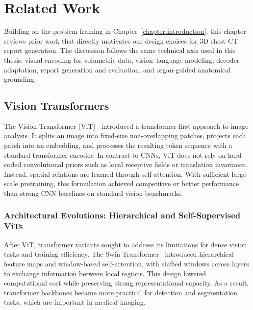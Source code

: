 \chapter{Related Work}\label{chapter:related_work}

Building on the problem framing in Chapter~\ref{chapter:introduction}, this chapter reviews prior work that directly motivates our design choices for 3D chest CT report generation. The discussion follows the same technical axis used in this thesis: visual encoding for volumetric data, vision--language modeling, decoder adaptation, report generation and evaluation, and organ-guided anatomical grounding.

\section{Vision Transformers}\label{sec:rw_vit}

The Vision Transformer (ViT)~\cite{dosovitskiy2021image} introduced a transformer-first approach to image analysis. It splits an image into fixed-size non-overlapping patches, projects each patch into an embedding, and processes the resulting token sequence with a standard transformer encoder. In contrast to CNNs, ViT does not rely on hard-coded convolutional priors such as local receptive fields or translation invariance. Instead, spatial relations are learned through self-attention. With sufficient large-scale pretraining, this formulation achieved competitive or better performance than strong CNN baselines on standard vision benchmarks.

\subsection{Architectural Evolutions: Hierarchical and Self-Supervised ViTs}

After ViT, transformer variants sought to address its limitations for dense vision tasks and training efficiency. The Swin Transformer~\cite{liu2021swin} introduced hierarchical feature maps and window-based self-attention, with shifted windows across layers to exchange information between local regions. This design lowered computational cost while preserving strong representational capacity. As a result, transformer backbones became more practical for detection and segmentation tasks, which are important in medical imaging.

